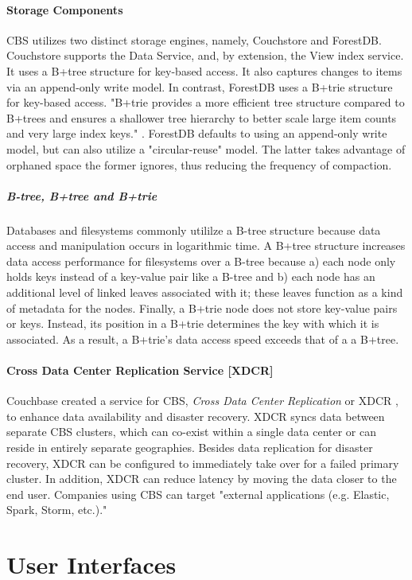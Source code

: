 \documentclass[9pt,twocolumn,twoside]{../../styles/osajnl}
\begin{document}
\paragraph{Storage Components} CBS utilizes two distinct storage engines, namely, Couchstore and ForestDB.  Couchstore supports the Data Service, and, by extension, the View index service.  It uses a B+tree structure for key-based access.  It also captures changes to items via an append-only write model. In contrast, ForestDB uses a B+trie structure for key-based access.  "B+trie provides a more efficient tree structure compared to B+trees and ensures a shallower tree hierarchy to better scale large item counts and very large index keys." \cite {www-bplustrie-cbsinc}.  ForestDB defaults to using an append-only write model, but can also utilize a "circular-reuse" model.  The latter takes advantage of orphaned space the former ignores, thus reducing the frequency of compaction.
\subparagraph{B-tree, B+tree and B+trie}
Databases and filesystems commonly utililze a B-tree structure because data access and manipulation occurs in logarithmic time.  A B+tree structure increases data access performance for filesystems over a B-tree because a) each node only holds keys instead of a key-value pair like a B-tree and b) each node has an additional level of linked leaves associated with it; these leaves function as a kind of metadata for the nodes.  Finally, a B+trie node does not store key-value pairs or keys.  Instead, its position in a B+trie determines the key with which it is associated.  As a result, a B+trie's data access speed exceeds that of a a B+tree.  

\paragraph{Cross Data Center Replication Service [XDCR]}
Couchbase created a service for CBS, \textit{Cross Data Center Replication} or XDCR \cite{www-xdcr-cbsinc}, to enhance data availability and disaster recovery.  XDCR syncs data between separate CBS clusters, which can co-exist within a single data center or can reside in entirely separate geographies.  Besides data replication for disaster recovery, XDCR can be configured to immediately take over for a failed primary cluster.  In addition, XDCR can reduce latency by moving the data closer to the end user.  Companies using CBS can target "external applications (e.g. Elastic, Spark, Storm, etc.)."

\section{User Interfaces}
\end{document}
